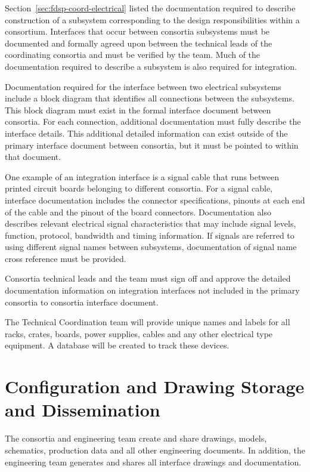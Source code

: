 Section~\ref{sec:fdsp-coord-electrical} listed the documentation
required to describe construction of a subsystem corresponding to the
design responsibilities within a consortium.  Interfaces that occur
between consortia subsystems must be documented and formally agreed
upon between the technical leads of the coordinating consortia and
must be verified by the  team.  Much of the
documentation required to describe a subsystem is also required for
integration.


Documentation required for the interface between two electrical
subsystems include a block diagram that identifies all connections
between the subsystems.  This block diagram must exist in the formal
interface document between consortia.  For each connection, additional
documentation must fully describe the interface
details. This additional detailed information can exist outside of the
primary interface document between consortia, but it must be pointed
to within that document.


One example of an integration interface is a signal cable that runs
between printed circuit boards belonging to different consortia.  For
a signal cable, interface documentation includes the connector
specifications, pinouts at each end of the cable and the pinout of the
board connectors.  Documentation also describes
relevant electrical signal characteristics that may include signal
levels, function, protocol, bandwidth and timing information.  If
signals are referred to using different signal names between
subsystems, documentation of signal name cross reference must be
provided.


Consortia technical leads and the  team must sign off
and approve the detailed documentation information on integration
interfaces not included in the primary consortia to consortia
interface document.

The Technical Coordination team will provide unique names and labels
for all racks, crates, boards, power supplies, cables and any other
electrical type equipment.  A database will be created to track these
devices.

\section{Configuration and Drawing Storage and Dissemination}
\label{sec:fdsp-coord-integ-modelplan}

The consortia and  engineering team create and share
drawings, models, schematics, production data and all other
engineering documents. In addition, the  engineering team
generates and shares all interface drawings and documentation.


